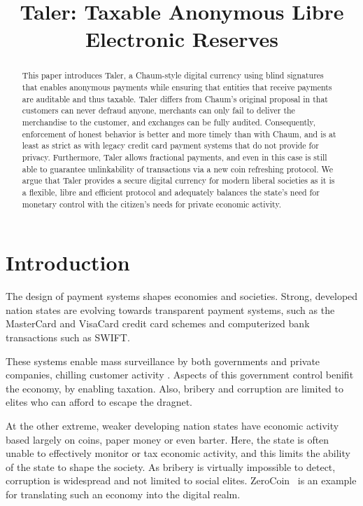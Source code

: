 \documentclass{llncs}
\title{Taler: Taxable Anonymous Libre Electronic Reserves}
\begin{document}
\mainmatter



\maketitle

\begin{abstract}
This paper introduces Taler, a Chaum-style digital currency using
blind signatures that enables anonymous payments while ensuring that
entities that receive payments are auditable and thus taxable.  Taler
differs from Chaum's original proposal in that customers can never
defraud anyone, merchants can only fail to deliver the merchandise to
the customer, and exchanges can be fully audited. Consequently,
enforcement of honest behavior is better and more timely than with
Chaum, and is at least as strict as with legacy credit card payment
systems that do not provide for privacy.  Furthermore, Taler allows
fractional payments, and even in this case is still able to guarantee
unlinkability of transactions via a new coin refreshing protocol.  We
argue that Taler provides a secure digital currency for modern liberal
societies as it is a flexible, libre and efficient protocol and
adequately balances the state's need for monetary control with the
citizen's needs for private economic activity.
\end{abstract}

\section{Introduction}

The design of payment systems shapes economies and societies. 
Strong, developed nation states are evolving towards transparent
payment systems, such as the MasterCard and VisaCard credit card
schemes and computerized bank transactions such as SWIFT.  

These systems enable mass surveillance by both governments and
private companies, chilling customer activity \cite{???}.
Aspects of this government control benifit the economy, by enabling
taxation.  Also, bribery and corruption are limited to elites who
can afford to escape the dragnet.  

At the other extreme, weaker developing nation states have economic
activity based largely on coins, paper money or even barter.  
Here, the state is often unable to effectively monitor or tax economic
activity, and this limits the ability of the state to shape the society.  
As bribery is virtually impossible to detect, corruption is widespread
and not limited to social elites.
%
ZeroCoin~\cite{miers2013zerocoin} is an example for translating such
an economy into the digital realm.
\end{document}
